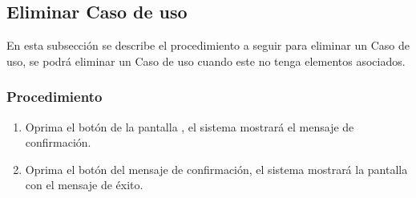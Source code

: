 \subsection{Eliminar Caso de uso}

En esta subsección se describe el procedimiento a seguir para eliminar un Caso de uso, se podrá eliminar un Caso de uso cuando este no tenga elementos asociados.

\subsubsection{Procedimiento}
\begin{enumerate}
	\item Oprima el botón \btnEliminar de la pantalla , el sistema mostrará el mensaje de confirmación.
	
	\item Oprima el botón  del mensaje de confirmación, el sistema mostrará la pantalla  con el mensaje de éxito.
\end{enumerate}


